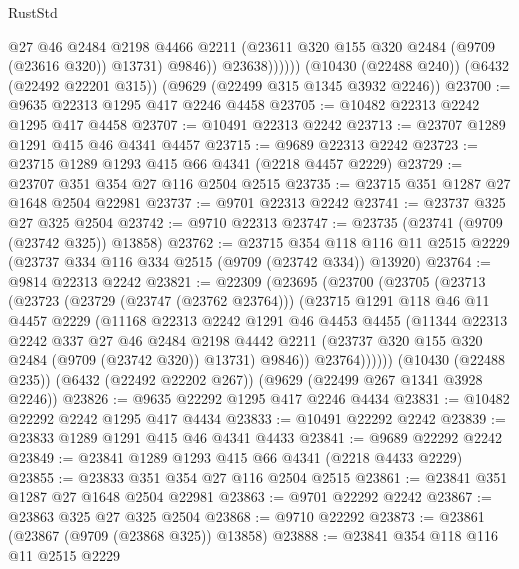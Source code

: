 \begin{lexlean}{RustStd}
\begin{coremodule}
                    @27
                    @46
                    @2484
                    @2198
                    @4466
                    @2211
                    (@23611 @320 @155 @320 @2484 (@9709 (@23616 @320)) @13731)
                    @9846))
                @23638))))))
    (@10430 (@22488 @240))
    (@6432 (@22492 @22201 @315))
    (@9629 (@22499 @315 @1345 @3932 @2246))
@23700 := @9635 @22313 @1295 @417 @2246 @4458
@23705 := @10482 @22313 @2242 @1295 @417 @4458
@23707 := @10491 @22313 @2242
@23713 := @23707 @1289 @1291 @415 @46 @4341 @4457
@23715 := @9689 @22313 @2242
@23723 := @23715 @1289 @1293 @415 @66 @4341 (@2218 @4457 @2229)
@23729 := @23707 @351 @354 @27 @116 @2504 @2515
@23735 := @23715 @351 @1287 @27 @1648 @2504 @22981
@23737 := @9701 @22313 @2242
@23741 := @23737 @325 @27 @325 @2504
@23742 := @9710 @22313
@23747 := @23735 (@23741 (@9709 (@23742 @325)) @13858)
@23762 := @23715
    @354
    @118
    @116
    @11
    @2515
    @2229
    (@23737 @334 @116 @334 @2515 (@9709 (@23742 @334)) @13920)
@23764 := @9814 @22313 @2242
@23821 := @22309
    (@23695
      (@23700
        (@23705
          (@23713
            (@23723
              (@23729 (@23747 (@23762 @23764)))
              (@23715
                @1291
                @118
                @46
                @11
                @4457
                @2229
                (@11168
                  @22313
                  @2242
                  @1291
                  @46
                  @4453
                  @4455
                  (@11344
                    @22313
                    @2242
                    @337
                    @27
                    @46
                    @2484
                    @2198
                    @4442
                    @2211
                    (@23737 @320 @155 @320 @2484 (@9709 (@23742 @320)) @13731)
                    @9846))
                @23764))))))
    (@10430 (@22488 @235))
    (@6432 (@22492 @22202 @267))
    (@9629 (@22499 @267 @1341 @3928 @2246))
@23826 := @9635 @22292 @1295 @417 @2246 @4434
@23831 := @10482 @22292 @2242 @1295 @417 @4434
@23833 := @10491 @22292 @2242
@23839 := @23833 @1289 @1291 @415 @46 @4341 @4433
@23841 := @9689 @22292 @2242
@23849 := @23841 @1289 @1293 @415 @66 @4341 (@2218 @4433 @2229)
@23855 := @23833 @351 @354 @27 @116 @2504 @2515
@23861 := @23841 @351 @1287 @27 @1648 @2504 @22981
@23863 := @9701 @22292 @2242
@23867 := @23863 @325 @27 @325 @2504
@23868 := @9710 @22292
@23873 := @23861 (@23867 (@9709 (@23868 @325)) @13858)
@23888 := @23841
    @354
    @118
    @116
    @11
    @2515
    @2229

\end{coremodule}
\end{lexlean}
